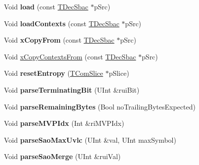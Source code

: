 \begin{DoxyCompactItemize}
\item 
\mbox{\label{class_t_dec_sbac_a89d8d38eef65969f0eeaf911708319f7}} 
Void {\bfseries load} (const \hyperlink{class_t_dec_sbac}{T\+Dec\+Sbac} $\ast$p\+Src)
\item 
\mbox{\label{class_t_dec_sbac_a7a1080b6407af864583d65781001d26a}} 
Void {\bfseries load\+Contexts} (const \hyperlink{class_t_dec_sbac}{T\+Dec\+Sbac} $\ast$p\+Src)
\item 
\mbox{\label{class_t_dec_sbac_aac9e61b1d8bb151526ae0db0d3e5689c}} 
Void {\bfseries x\+Copy\+From} (const \hyperlink{class_t_dec_sbac}{T\+Dec\+Sbac} $\ast$p\+Src)
\item 
Void \hyperlink{class_t_dec_sbac_aebfb4f8804bc2fab34b35bdd56a7480a}{x\+Copy\+Contexts\+From} (const \hyperlink{class_t_dec_sbac}{T\+Dec\+Sbac} $\ast$p\+Src)
\item 
\mbox{\label{class_t_dec_sbac_abb3b4af41f9b0f28e3e5b28eb1b0712d}} 
Void {\bfseries reset\+Entropy} (\hyperlink{class_t_com_slice}{T\+Com\+Slice} $\ast$p\+Slice)
\item 
\mbox{\label{class_t_dec_sbac_a27ed6eec08c2b6db11fac43e95cf2470}} 
Void {\bfseries parse\+Terminating\+Bit} (U\+Int \&rui\+Bit)
\item 
\mbox{\label{class_t_dec_sbac_a2bdb11f2beae3c4d9822f834309eadc7}} 
Void {\bfseries parse\+Remaining\+Bytes} (Bool no\+Trailing\+Bytes\+Expected)
\item 
\mbox{\label{class_t_dec_sbac_a0978b2d1331ddb6c60a657d78cb700b7}} 
Void {\bfseries parse\+M\+V\+P\+Idx} (Int \&ri\+M\+V\+P\+Idx)
\item 
\mbox{\label{class_t_dec_sbac_aa47937dc8fc3dca7da10a735bd55d4cd}} 
Void {\bfseries parse\+Sao\+Max\+Uvlc} (U\+Int \&val, U\+Int max\+Symbol)
\item 
\mbox{\label{class_t_dec_sbac_a14ec3683db3312753b831e8c85ff4254}} 
Void {\bfseries parse\+Sao\+Merge} (U\+Int \&rui\+Val)
\item 

\end{DoxyCompactItemize}
